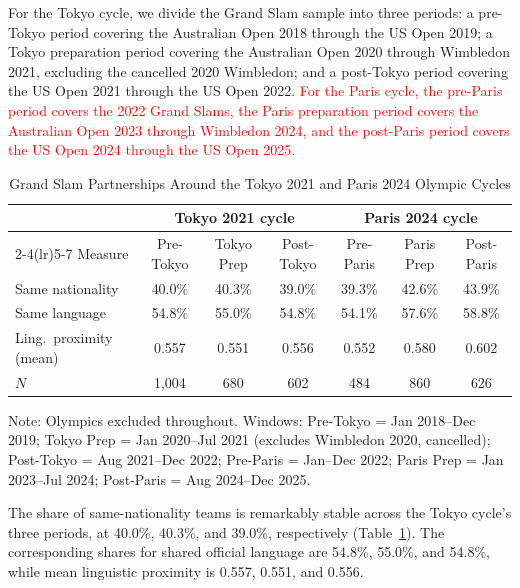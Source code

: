 \documentclass[10pt]{article}
\begin{document}
For the Tokyo cycle, we divide the Grand Slam sample into three periods: a pre-Tokyo period covering the Australian Open 2018 through the US Open 2019; a Tokyo preparation period covering the Australian Open 2020 through Wimbledon 2021, excluding the cancelled 2020 Wimbledon; and a post-Tokyo period covering the US Open 2021 through the US Open 2022. \textcolor{red}{For the Paris cycle, the pre-Paris period covers the 2022 Grand Slams, the Paris preparation period covers the Australian Open 2023 through Wimbledon 2024, and the post-Paris period covers the US Open 2024 through the US Open 2025.}


\begin{table}[htbp]
\color{red}
\centering
\caption{Grand Slam Partnerships Around the Tokyo 2021 and Paris 2024 Olympic Cycles \label{tab:t2ab}}
\begin{threeparttable}
\begin{tabular}{lcccccc}
\toprule
& \multicolumn{3}{c}{Tokyo 2021 cycle} & \multicolumn{3}{c}{Paris 2024 cycle} \\
\cmidrule(lr){2-4}\cmidrule(lr){5-7}
Measure & Pre-Tokyo & Tokyo Prep & Post-Tokyo & Pre-Paris & Paris Prep & Post-Paris \\
\midrule
Same nationality & 40.0\% & 40.3\% & 39.0\% & 39.3\% & 42.6\% & 43.9\% \\
Same language & 54.8\% & 55.0\% & 54.8\% & 54.1\% & 57.6\% & 58.8\% \\
Ling.\ proximity (mean) & 0.557 & 0.551 & 0.556 & 0.552 & 0.580 & 0.602 \\
\midrule
$N$ & 1,004 & 680 & 602 & 484 & 860 & 626 \\
\bottomrule
\end{tabular}
\begin{tablenotes}
\small
\item Note: Olympics excluded throughout. Windows: Pre-Tokyo = Jan 2018--Dec 2019; Tokyo Prep = Jan 2020--Jul 2021 (excludes Wimbledon 2020, cancelled); Post-Tokyo = Aug 2021--Dec 2022; Pre-Paris = Jan--Dec 2022; Paris Prep = Jan 2023--Jul 2024; Post-Paris = Aug 2024--Dec 2025.
\end{tablenotes}
\end{threeparttable}
\end{table}

The share of same-nationality teams is remarkably stable across the Tokyo cycle's three periods, at 40.0\%, 40.3\%, and 39.0\%, respectively (Table~\ref{tab:t2ab}). The corresponding shares for shared official language are 54.8\%, 55.0\%, and 54.8\%, while mean linguistic proximity is 0.557, 0.551, and 0.556.
\end{document}

